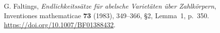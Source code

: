 G. Faltings,
\emph{Endlichkeitss\"atze f\"ur abelsche Variet\"aten \"uber Zahlk\"orpern},
Inventiones mathematicae \textbf{73} (1983), 349--366,
\S2, Lemma~1, p.~350.
\url{https://doi.org/10.1007/BF01388432}.
